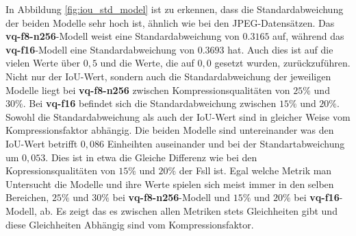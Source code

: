             In Abbildung \ref{fig:iou_std_model} ist zu erkennen, dass die Standardabweichung der beiden Modelle sehr hoch ist, ähnlich wie bei den JPEG-Datensätzen. Das \textbf{vq-f8-n256}-Modell weist eine Standardabweichung von $0.3165$ auf, während das \textbf{vq-f16}-Modell eine Standardabweichung von $0.3693$ hat.
            Auch dies ist auf die vielen Werte über $0,5$ und die Werte, die auf $0,0$ gesetzt wurden, zurückzuführen. Nicht nur der IoU-Wert, sondern auch die Standardabweichung der jeweiligen Modelle liegt bei \textbf{vq-f8-n256} zwischen Kompressionsqualitäten von $25\%$ und $30\%$. Bei \textbf{vq-f16} befindet sich die Standardabweichung zwischen $15\%$ und $20\%$. Sowohl die Standardabweichung als auch der IoU-Wert sind in gleicher Weise vom Kompressionsfaktor abhängig.
            Die beiden Modelle sind untereinander was den IoU-Wert betrifft $0,086$ Einheihten auseinander und bei der Standartabweichung um $0,053$.
            Dies ist in etwa die Gleiche Differenz wie bei den Kopressionsqualitäten von $15\%$ und $20\%$ der Fsll ist.
            Egal welche Metrik man Untersucht die Modelle und ihre Werte spielen sich meist immer in den selben Bereichen, $25\%$ und $30\%$ bei \textbf{vq-f8-n256}-Modell und $15\%$ und $20\%$ bei \textbf{vq-f16}-Modell, ab. Es zeigt das es zwischen allen Metriken stets Gleichheiten gibt und diese Gleichheiten
            Abhängig sind vom Kompressionsfaktor.
            